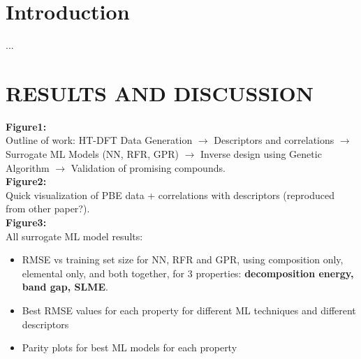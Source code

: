 \documentclass[]{revtex4-2}
\begin{document}
\section*{Introduction}

... \\



\section*{RESULTS AND DISCUSSION}

\textbf{Figure1:} \\
Outline of work: HT-DFT Data Generation $\rightarrow$ Descriptors and correlations $\rightarrow$ Surrogate ML Models (NN, RFR, GPR) $\rightarrow$ Inverse design using Genetic Algorithm $\rightarrow$ Validation of promising compounds. \\

\textbf{Figure2:} \\
Quick visualization of PBE data + correlations with descriptors (reproduced from other paper?). \\

\textbf{Figure3:} \\
All surrogate ML model results: 
\begin{itemize}
\item RMSE vs training set size for NN, RFR and GPR, using composition only, elemental only, and both together, for 3 properties: \textbf{decomposition energy, band gap, SLME}.
\item Best RMSE values for each property for different ML techniques and different descriptors
\item Parity plots for best ML models for each property
\end{itemize} \\
\end{document}
